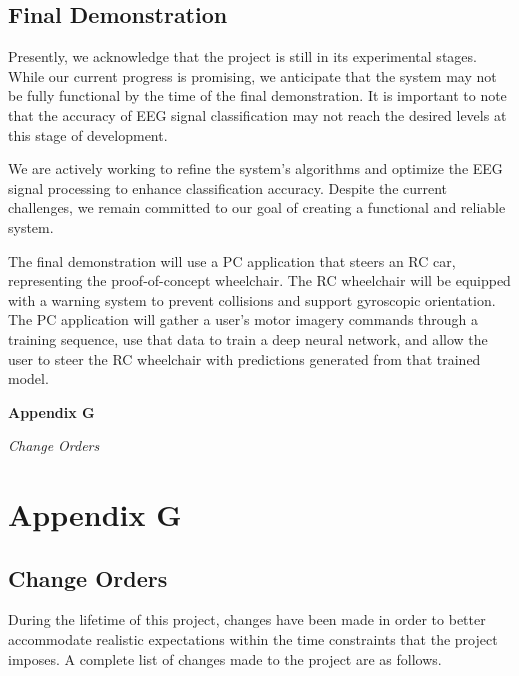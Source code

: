 \documentclass[conference]{IEEEtran}
\begin{document}
    \subsection{Final Demonstration}
    Presently, we acknowledge that the project is still in its experimental stages. While our current progress is promising, we anticipate that the system may not be fully functional by the time of the final demonstration. It is important to note that the accuracy of EEG signal classification may not reach the desired levels at this stage of development.  

    We are actively working to refine the system’s algorithms and optimize the EEG signal processing to enhance classification accuracy. Despite the current challenges, we remain committed to our goal of creating a functional and reliable system.  

    The final demonstration will use a PC application that steers an RC car, representing the proof-of-concept wheelchair. The RC wheelchair will be equipped with a warning system to prevent collisions and support gyroscopic orientation. The PC application will gather a user’s motor imagery commands through a training sequence, use that data to train a deep neural network, and allow the user to steer the RC wheelchair with predictions generated from that trained model.  


\clearpage
\onecolumn
\begin{center}
    \vspace*{5cm}
     {\Huge\bfseries Appendix G \par}
     \vspace{1cm}
    \textit{Change Orders} \\
\end{center}
\clearpage
\twocolumn

\setcounter{section}{7}
\renewcommand{\thesubsection}{G.\Alph{subsection}}
\section*{\textbf{Appendix G}}
        \setcounter{figure}{0}
        \renewcommand{\thefigure}{G.\arabic{figure}}
        \setcounter{table}{0}
        \renewcommand{\thetable}{G.\arabic{table}}
        \setcounter{subsection}{0}

\subsection{Change Orders}
During the lifetime of this project, changes have been made in order to better accommodate realistic expectations within the time constraints that the project imposes. A complete list of changes made to the project are as follows.  
\end{document}
